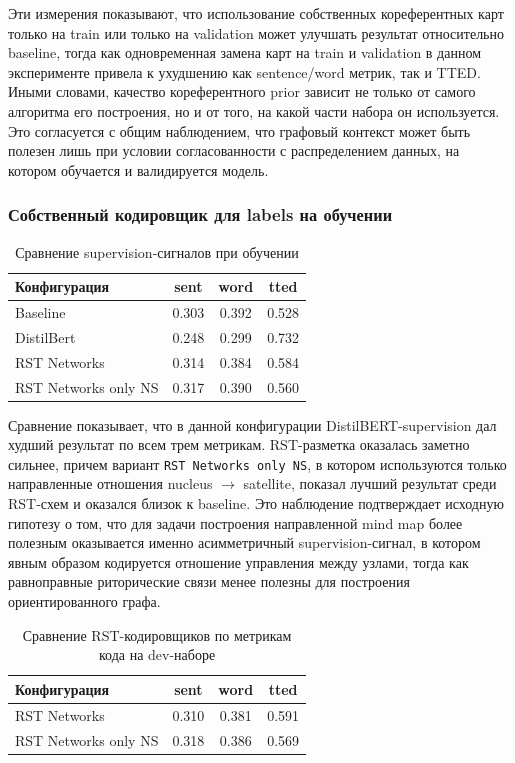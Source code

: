 \documentclass[12pt,a4paper]{article}
\begin{document}
Эти измерения показывают, что использование собственных кореферентных карт только на
train или только на validation может улучшать результат относительно baseline, тогда как
одновременная замена карт на train и validation в данном эксперименте привела к ухудшению
как sentence/word метрик, так и TTED. Иными словами, качество кореферентного prior
зависит не только от самого алгоритма его построения, но и от того, на какой части
набора он используется. Это согласуется с общим наблюдением, что графовый контекст
может быть полезен лишь при условии согласованности с распределением данных, на
котором обучается и валидируется модель.

\subsubsection{Собственный кодировщик для labels на обучении}

\begin{table}[H]
\centering
\caption{Сравнение supervision-сигналов при обучении}
\begin{tabular}{lccc}
\toprule
Конфигурация & sent & word & tted \\
\midrule
Baseline & 0.303 & 0.392 & 0.528 \\
DistilBert & 0.248 & 0.299 & 0.732 \\
RST Networks & 0.314 & 0.384 & 0.584 \\
RST Networks only NS & 0.317 & 0.390 & 0.560 \\
\bottomrule
\end{tabular}
\end{table}

Сравнение показывает, что в данной конфигурации DistilBERT-supervision дал худший
результат по всем трем метрикам. RST-разметка оказалась заметно сильнее, причем вариант
\texttt{RST Networks only NS}, в котором используются только направленные отношения
nucleus $\rightarrow$ satellite, показал лучший результат среди RST-схем и оказался
близок к baseline. Это наблюдение подтверждает исходную гипотезу о том, что для
задачи построения направленной mind map более полезным оказывается именно
асимметричный supervision-сигнал, в котором явным образом кодируется отношение
управления между узлами, тогда как равноправные риторические связи менее полезны
для построения ориентированного графа.

\begin{table}[H]
\centering
\caption{Сравнение RST-кодировщиков по метрикам кода на dev-наборе}
\begin{tabular}{lccc}
\toprule
Конфигурация & sent & word & tted \\
\midrule
RST Networks & 0.310 & 0.381 & 0.591 \\
RST Networks only NS & 0.318 & 0.386 & 0.569 \\
\bottomrule
\end{tabular}
\end{table}
\end{document}
